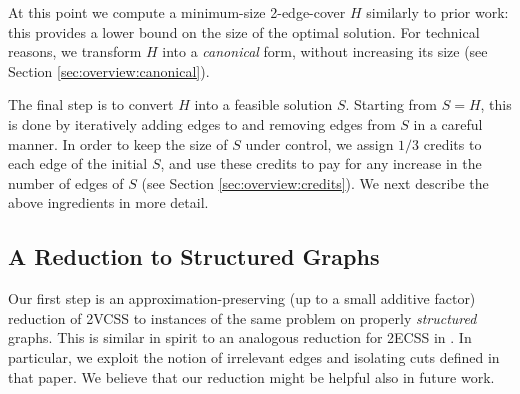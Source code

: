 \documentclass{article}
\begin{document}
At this point we compute a minimum-size 2-edge-cover $H$ similarly to prior work: this provides a lower bound on the size of the optimal solution. For technical reasons, we transform $H$ into a \emph{canonical} form,  without increasing its size (see Section \ref{sec:overview:canonical}).

The final step is to convert $H$ into a feasible solution $S$. Starting from $S=H$, this is done by iteratively adding edges to and removing edges from $S$ in a careful manner. In order to keep the size of $S$ under control, we assign $1/3$ credits to each edge of the initial $S$, and use these credits to pay for any increase in the number of edges of $S$ (see Section \ref{sec:overview:credits}). We next describe the above ingredients in more detail.

\subsection{A Reduction to Structured Graphs}
\label{sec:overview:structured}

Our first step is an approximation-preserving (up to a small additive factor) reduction of 2VCSS to instances of the same problem on properly \emph{structured} graphs. This is similar in spirit to an analogous reduction for 2ECSS in \cite{GGJ23}. In particular, we exploit the notion of irrelevant edges and isolating cuts defined in that paper. We believe that our reduction might be helpful also in future work.
\end{document}
